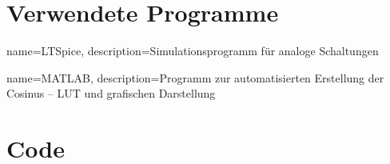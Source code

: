 \documentclass[12pt,a4paper]{article}
\begin{document}
\newpage

\appendix %
\section{Verwendete Programme}

{
    name=LTSpice,
    description={Simulationsprogramm für analoge Schaltungen}
}

{
    name=MATLAB,
    description={Programm zur automatisierten Erstellung der Cosinus -- \ac{LUT} und grafischen Darstellung}
}

\glsaddall
\setlength{\LTleft}{-5pt}
\renewcommand{\glsnamefont}[1]{\textbf{#1}}
\printglossary[title=Verwendete Programme, toctitle=Verwendete Programme,style=long,nonumberlist]

\section{Code}


\end{document}
